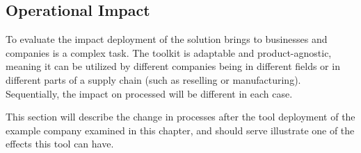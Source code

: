 \subsection{Operational Impact}

To evaluate the impact deployment of the solution brings to businesses and companies is a complex task. The toolkit is adaptable and product-agnostic, meaning it can be utilized by different companies being in different fields or in different parts of a supply chain (such as reselling or manufacturing). Sequentially, the impact on processed will be different in each case.

This section will describe the change in processes after the tool deployment of the example company examined in this chapter, and should serve illustrate one of the effects this tool can have.  